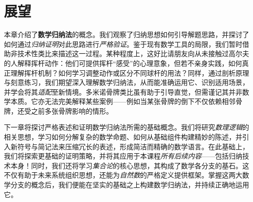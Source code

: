 \section{展望}

本章介绍了\textbf{数学归纳法}的概念。我们观察了归纳思想如何引导解题思路，并探讨了如何通过\emph{归纳证明}对此思路进行\emph{严格验证}。鉴于现有数学工具的局限，我们暂时借助非技术性类比来描述这一过程。某种程度上，这好比请朋友向从未接触过高尔夫的人解释挥杆动作：他们可提供挥杆``感受''的心理意象，但若不亲身实践，如何真正理解挥杆机制？如何学习调整动作或区分不同球杆的用法？同样，通过剖析原理与刻意练习，我们期望深入理解数学归纳法，从而能准确运用它、识别适用场景，并学会将其\emph{适配}至新情境。多米诺骨牌类比虽有助于引导直觉，但需谨记其并非数学本质。它亦无法完美解释某些案例——例如当某张骨牌的倒下不仅依赖相邻骨牌，还受之前多张骨牌影响的情形。

下一章将探讨严格表述和证明数学归纳法所需的基础概念。我们将研究\emph{数理逻辑}的相关思想，学习如何分解复杂的数学命题、如何从基础组件构建精妙的陈述，并引入新符号与简记法来压缩冗长的表述，形成简洁而精确的数学语言。在此基础上，我们将探索更基础的证明策略，并将其应用于本课程\emph{所有后续内容}——包括归纳技术本身！同时，我们还将学习\emph{集合论}的核心思想，其构成了数学各分支的基石。这不仅有助于未来系统组织思想，还能为\emph{自然数}的严格定义提供框架。掌握这两大数学分支的概念后，我们便能在坚实的基础之上构建数学归纳法，并持续正确地运用它。
